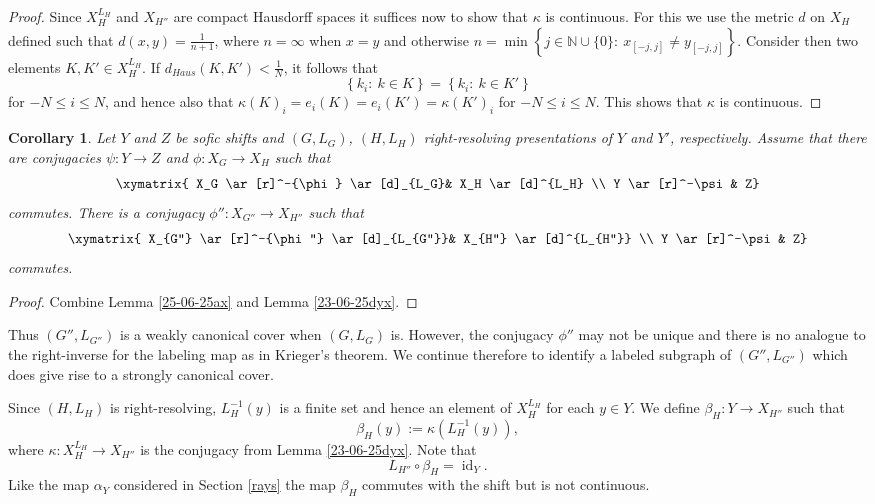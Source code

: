 \documentclass[12pt,oneside,english]{amsart}
\newcommand{\id}{\operatorname{id}}
\newtheorem{corollary}[thm]{Corollary}
\begin{document}
\begin{proof}
Since $X_H^{L_H}$ and $X_{H''} $ are compact Hausdorff spaces it suffices now to show that $\kappa$ is continuous. For this we use the metric $d$ on $X_H$ defined such that $d(x,y) = \frac{1}{n+1}$, where $n = \infty$ when $x = y$ and otherwise $n = \min \left\{ j\in \mathbb N \cup \{0\} : \ x_{[-j,j]} \neq y_{[-j,j]}\right\}$. Consider then two elements $K,K' \in X_H^{L_H}$. If $d_{Haus}(K,K') < \frac{1}{N}$, it follows that 
$$
\left\{k_i : \ k \in K\right\} =  \left\{k_i : \ k \in K'\right\}  
$$
for $-N \leq i \leq N$, and hence also that $\kappa(K)_i = e_i(K) = e_i(K') = \kappa(K')_i$ for $-N \leq i \leq N$. This shows that $\kappa$ is continuous.
\end{proof}


\begin{corollary}\label{17-11-25} Let $Y$ and $Z$ be sofic shifts and $(G,L_G)$, $(H,L_H)$ right-resolving presentations of $Y$ and $Y'$, respectively. Assume that there are conjugacies $\psi : Y \to Z$ and $\phi : X_G \to X_H$ such that 
\begin{equation*}\label{17-11-25b}
\xymatrix{
 X_G \ar[r]^-{\phi} \ar[d]_{L_G}&  X_H \ar[d]^{L_H} \\
 Y  \ar[r]^-\psi & Z}
\end{equation*}
commutes. There is a conjugacy $\phi'' : X_{G''} \to X_{H''}$ such that
\begin{equation*}\label{17-11-25c}
\xymatrix{
 X_{G''} \ar[r]^-{\phi''} \ar[d]_{L_{G''}}&  X_{H''} \ar[d]^{L_{H''}} \\
Y   \ar[r]^-\psi & Z}
\end{equation*}
commutes.
\end{corollary}
\begin{proof} Combine Lemma \ref{25-06-25ax} and Lemma \ref{23-06-25dyx}.
\end{proof}


Thus $({G''},L_{G''})$ is a weakly canonical cover when $(G,L_G)$ is. However, the conjugacy $\phi''$ may not be unique and there is no analogue to the right-inverse for the labeling map as in Krieger's theorem.  We continue therefore to identify a labeled subgraph of $(G'',L_{G''})$ which does give rise to a strongly canonical cover.

\bigskip
 

Since $(H,L_H)$ is right-resolving, $L_H^{-1}(y)$ is a finite set and hence an element of $X_H^{L_H}$ for each $y \in Y$. We define $\beta_H : Y \to X_{H''} $ such that
$$
\beta_H(y) := \kappa(L_H^{-1}(y)),
$$
where $\kappa : X_H^{L_H} \to X_{H''}$ is the conjugacy from Lemma \ref{23-06-25dyx}. Note that
\begin{equation}\label{22-11-25}
L_{H''} \circ \beta_H = \id_Y .
\end{equation}
Like the map $\alpha_Y$ considered in Section \ref{rays} the map $\beta_H$ commutes with the shift but is not continuous.
\end{document}
